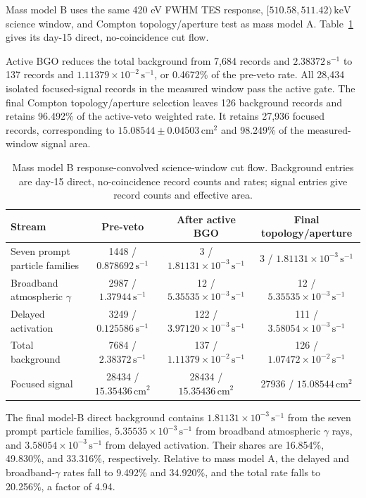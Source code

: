 \documentclass[11pt]{article}
\newcommand{\keV}{\ensuremath{\,\mathrm{keV}}}
\newcommand{\cps}{\ensuremath{\,\mathrm{s^{-1}}}}
\begin{document}
Mass model B uses the same 420 eV FWHM TES response, $[510.58,511.42)\keV$ science window, and Compton topology/aperture test as mass model A. Table~\ref{tab:optimized_cutflow} gives its day-15 direct, no-coincidence cut flow.

Active BGO reduces the total background from 7,684 records and $2.38372\cps$ to 137 records and $1.11379\times10^{-2}\cps$, or 0.4672\% of the pre-veto rate. All 28,434 isolated focused-signal records in the measured window pass the active gate. The final Compton topology/aperture selection leaves 126 background records and retains 96.492\% of the active-veto weighted rate. It retains 27,936 focused records, corresponding to $15.08544\pm0.04503\,\mathrm{cm^2}$ and 98.249\% of the measured-window signal area.

\begin{table}[H]
\centering
\caption{Mass model B response-convolved science-window cut flow. Background entries are day-15 direct, no-coincidence record counts and rates; signal entries give record counts and effective area.}
\label{tab:optimized_cutflow}
\footnotesize
\begin{tabular}{lccc}
\toprule
Stream & Pre-veto & After active BGO & Final topology/aperture \\
\midrule
Seven prompt particle families & 1448 / $0.878692\cps$ & 3 / $1.81131\times10^{-3}\cps$ & 3 / $1.81131\times10^{-3}\cps$ \\
Broadband atmospheric $\gamma$ & 2987 / $1.37944\cps$ & 12 / $5.35535\times10^{-3}\cps$ & 12 / $5.35535\times10^{-3}\cps$ \\
Delayed activation & 3249 / $0.125586\cps$ & 122 / $3.97120\times10^{-3}\cps$ & 111 / $3.58054\times10^{-3}\cps$ \\
Total background & 7684 / $2.38372\cps$ & 137 / $1.11379\times10^{-2}\cps$ & 126 / $1.07472\times10^{-2}\cps$ \\
Focused signal & 28434 / $15.35436\,\mathrm{cm^2}$ & 28434 / $15.35436\,\mathrm{cm^2}$ & 27936 / $15.08544\,\mathrm{cm^2}$ \\
\bottomrule
\end{tabular}
\end{table}

The final model-B direct background contains $1.81131\times10^{-3}\cps$ from
the seven prompt particle families, $5.35535\times10^{-3}\cps$ from broadband
atmospheric $\gamma$ rays, and $3.58054\times10^{-3}\cps$ from delayed
activation. Their shares are 16.854\%, 49.830\%, and 33.316\%, respectively.
Relative to mass model A, the delayed and broadband-$\gamma$ rates fall to
9.492\% and 34.920\%, and the total rate falls to 20.256\%, a factor of 4.94.
\end{document}

